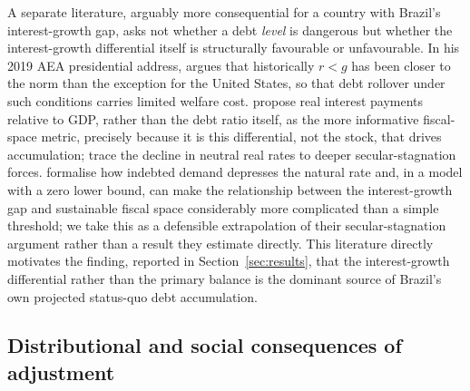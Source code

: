 \documentclass[11pt,a4paper]{article}
\begin{document}
A separate literature, arguably more consequential for a country with Brazil's interest-growth gap, asks not whether a debt \emph{level} is dangerous but whether the interest-growth differential itself is structurally favourable or unfavourable. In his 2019 AEA presidential address, \citet{blanchard2019} argues that historically $r<g$ has been closer to the norm than the exception for the United States, so that debt rollover under such conditions carries limited welfare cost. \citet{furmansummers2020} propose real interest payments relative to GDP, rather than the debt ratio itself, as the more informative fiscal-space metric, precisely because it is this differential, not the stock, that drives accumulation; \citet{rachelsummers2019} trace the decline in neutral real rates to deeper secular-stagnation forces. \citet{mianstraubsufi2021,mianstraubsufi2025} formalise how indebted demand depresses the natural rate and, in a model with a zero lower bound, can make the relationship between the interest-growth gap and sustainable fiscal space considerably more complicated than a simple threshold; we take this as a defensible extrapolation of their secular-stagnation argument rather than a result they estimate directly. This literature directly motivates the finding, reported in Section~\ref{sec:results}, that the interest-growth differential rather than the primary balance is the dominant source of Brazil's own projected status-quo debt accumulation.

\subsection{Distributional and social consequences of adjustment}
\label{sec:lit-distributional}
\end{document}
